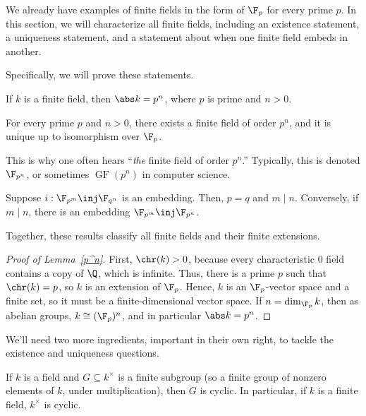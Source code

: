 We already have examples of finite fields in the form of $\F_p$ for every prime $p$. In this section, we will
characterize all finite fields, including an existence statement, a uniqueness statement, and a statement about
when one finite field embeds in another.

Specifically, we will prove these statements.
\begin{lem}
\label{p^n}
If $k$ is a finite field, then $\abs k = p^n$, where $p$ is prime and $n > 0$.
\end{lem}
\begin{thm}
\label{ff_ex_un}
For every prime $p$ and $n > 0$, there exists a finite field of order $p^n$, and it is unique up to isomorphism over
$\F_p$.
\end{thm}
This is why one often hears ``\emph{the} finite field of order $p^n$.'' Typically, this is denoted $\F_{p^n}$, or
sometimes $\operatorname{GF}(p^n)$ in computer science.
\begin{thm}
\label{ff_ext}
Suppose $i:\F_{p^m}\inj\F_{q^n}$ is an embedding. Then, $p = q$ and $m\mid n$. Conversely, if $m\mid n$, there is
an embedding $\F_{p^m}\inj\F_{p^n}$.
\end{thm}
Together, these results classify all finite fields and their finite extensions.
\begin{proof}[Proof of Lemma~\ref{p^n}]
First, $\chr(k) > 0$, because every characteristic $0$ field contains a copy of $\Q$, which is infinite. Thus,
there is a prime $p$ such that $\chr(k) = p$, so $k$ is an extension of $\F_p$. Hence, $k$ is an $\F_p$-vector
space and a finite set, so it must be a finite-dimensional vector space. If $n = \dim_{\F_p} k$, then as abelian
groups, $k\cong(\F_p)^n$, and in particular $\abs k = p^n$.
\end{proof}
We'll need two more ingredients, important in their own right, to tackle the existence and uniqueness questions.
\begin{prop}
If $k$ is a field and $G\subseteq k^\times$ is a finite subgroup (so a finite group of nonzero elements
of $k$, under multiplication), then $G$ is cyclic. In particular, if $k$ is a finite field, $k^\times$ is cyclic.
\end{prop}
